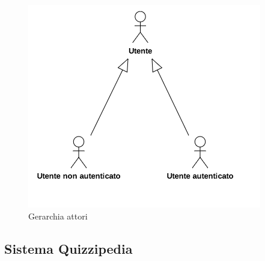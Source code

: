 \documentclass[a4paper,11pt]{article}
\begin{document}
\begin{figure}[h!]
\centering
\includegraphics[scale=1]{../immagini/Actors.png}
\caption{Gerarchia attori}
\end{figure}

\newpage
\subsection{Sistema Quizzipedia}
\end{document}
